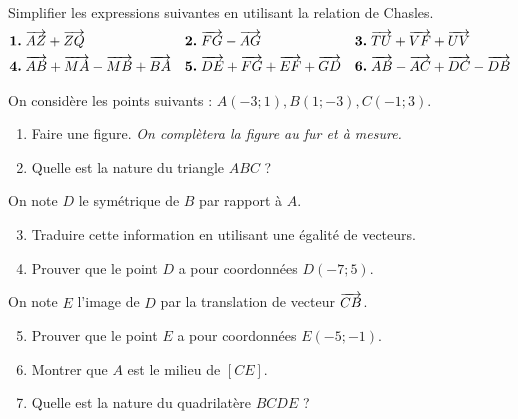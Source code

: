 \documentclass[11pt]{article}
\begin{document}
\begin{exo}
  Simplifier les expressions suivantes en utilisant la relation de Chasles.
  \begin{align*}
    \textbf{1.}\;& \overrightarrow{AZ} + \overrightarrow{ZQ} &
    \textbf{2.}\;& \overrightarrow{FG} - \overrightarrow{AG} &
    \textbf{3.}\;& \overrightarrow{TU} + \overrightarrow{VF} + \overrightarrow{UV} \\
    \textbf{4.}\;& \overrightarrow{AB} + \overrightarrow{MA} - \overrightarrow{MB} + \overrightarrow{BA} &
    \textbf{5.}\;& \overrightarrow{DE} + \overrightarrow{FG} + \overrightarrow{EF} + \overrightarrow{GD} &
    \textbf{6.}\;& \overrightarrow{AB} - \overrightarrow{AC} + \overrightarrow{DC} - \overrightarrow{DB}
  \end{align*}
\end{exo}

\begin{exo}
  On considère les points suivants : $A(-3; 1), B(1; -3), C(-1; 3)$.
  \begin{enumerate}
    \item Faire une figure. \emph{On complètera la figure au fur et à mesure.}
    \item Quelle est la nature du triangle $ABC$ ?
  \end{enumerate}
  On note $D$ le symétrique de $B$ par rapport à $A$.
  \begin{enumerate}
      \setcounter{enumi}{2}
    \item Traduire cette information en utilisant une égalité de vecteurs.
    \item Prouver que le point $D$ a pour coordonnées $D(-7; 5)$.
  \end{enumerate}
  On note $E$ l'image de $D$ par la translation de vecteur $\overrightarrow{CB}$.
  \begin{enumerate}
      \setcounter{enumi}{4}
    \item Prouver que le point $E$ a pour coordonnées $E(-5; -1)$.
    \item Montrer que $A$ est le milieu de $\left[ CE \right]$.
    \item Quelle est la nature du quadrilatère $BCDE$ ?
  \end{enumerate}
\end{exo}
\end{document}
